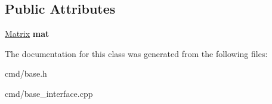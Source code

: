 \subsection*{Public Attributes}
\begin{DoxyCompactItemize}
\item 
\hyperlink{classMatrix}{Matrix} {\bfseries mat}\hypertarget{classBaseInterface_1_1Room_1_1BaseShip_ad685d90ded6daa6fc81e9183f78a393e}{}\label{classBaseInterface_1_1Room_1_1BaseShip_ad685d90ded6daa6fc81e9183f78a393e}

\end{DoxyCompactItemize}


The documentation for this class was generated from the following files\+:\begin{DoxyCompactItemize}
\item 
cmd/base.\+h\item 
cmd/base\+\_\+interface.\+cpp\end{DoxyCompactItemize}

